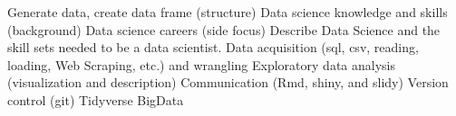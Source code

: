 \begin{outline}
	\1 Generate data, create data frame (structure)
	\1 Data science knowledge and skills (background)
	\1 Data science careers  (side focus)
	\1 Describe Data Science and the skill sets needed to be a data scientist.
	\1 Data acquisition (sql, csv, reading, loading, Web Scraping, etc.) and wrangling  
	\1 Exploratory data analysis (visualization and description)  
	\1 Communication (Rmd, shiny, and slidy)
	\1 Version control (git)
	\1 Tidyverse
	\1 BigData
\end{outline}

